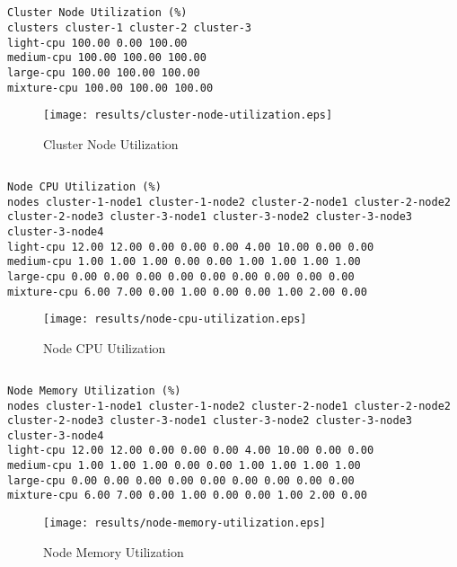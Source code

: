 \documentclass{elsart}
\begin{document}
\subsection{}

\begin{lstlisting}[caption={Cluster Node Utilization}]
Cluster Node Utilization (%)
clusters cluster-1 cluster-2 cluster-3
light-cpu 100.00 0.00 100.00
medium-cpu 100.00 100.00 100.00
large-cpu 100.00 100.00 100.00
mixture-cpu 100.00 100.00 100.00
\end{lstlisting}

\begin{figure}[ht]
\centering
\texttt{[image: results/cluster-node-utilization.eps]}
\caption{Cluster Node Utilization}\label{fig:cluster-node-utilization.eps}
\end{figure}

\subsection{}

\begin{lstlisting}[caption={Node CPU Utilization}]
Node CPU Utilization (%)
nodes cluster-1-node1 cluster-1-node2 cluster-2-node1 cluster-2-node2 cluster-2-node3 cluster-3-node1 cluster-3-node2 cluster-3-node3 cluster-3-node4
light-cpu 12.00 12.00 0.00 0.00 0.00 4.00 10.00 0.00 0.00
medium-cpu 1.00 1.00 1.00 0.00 0.00 1.00 1.00 1.00 1.00
large-cpu 0.00 0.00 0.00 0.00 0.00 0.00 0.00 0.00 0.00
mixture-cpu 6.00 7.00 0.00 1.00 0.00 0.00 1.00 2.00 0.00
\end{lstlisting}

\begin{figure}[ht]
\centering
\texttt{[image: results/node-cpu-utilization.eps]}
\caption{Node CPU Utilization}\label{fig:node-cpu-utilization.eps}
\end{figure}

\subsection{}

\begin{lstlisting}[caption={Node Memory Utilization}]
Node Memory Utilization (%)
nodes cluster-1-node1 cluster-1-node2 cluster-2-node1 cluster-2-node2 cluster-2-node3 cluster-3-node1 cluster-3-node2 cluster-3-node3 cluster-3-node4
light-cpu 12.00 12.00 0.00 0.00 0.00 4.00 10.00 0.00 0.00
medium-cpu 1.00 1.00 1.00 0.00 0.00 1.00 1.00 1.00 1.00
large-cpu 0.00 0.00 0.00 0.00 0.00 0.00 0.00 0.00 0.00
mixture-cpu 6.00 7.00 0.00 1.00 0.00 0.00 1.00 2.00 0.00
\end{lstlisting}

\begin{figure}[ht]
\centering
\texttt{[image: results/node-memory-utilization.eps]}
\caption{Node Memory Utilization}\label{fig:node-memory-utilization.eps}
\end{figure}
\end{document}
